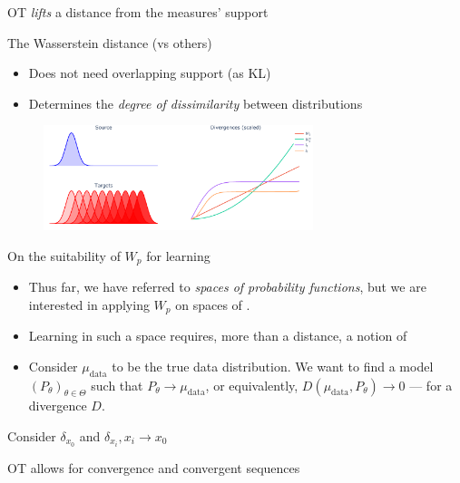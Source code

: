 \documentclass[pdf,aspectratio=169,10pt]{beamer}
\begin{document}
\begin{frame}{OT \emph{lifts} a distance from the measures' support}
\end{frame}

\begin{frame}{The Wasserstein distance (vs others)}
    \begin{itemize}
        \item Does not need overlapping support (as KL)
        \item Determines the \emph{degree of dissimilarity} between distributions
    \end{itemize}
    \begin{figure}
        \centering
            \includegraphics[trim={0 0 0 0},clip, width=0.7\textwidth]{../img/wasserstein_1d.pdf}
        \end{figure}
        \centering
        \small

\end{frame}

\begin{frame}{On the suitability of $W_p$ for learning}

\begin{itemize}
    \item Thus far, we have referred to \emph{spaces of probability functions}, but we are interested in applying $W_p$ on spaces of .
    \item Learning in such a space requires, more than a distance, a notion of 
    \item Consider $\mu_\text{data}$ to be the true data distribution. We want to find a model $(P_\theta)_{\theta\in\Theta}$ such that $P_\theta \to \mu_\text{data}$, or equivalently, $D(\mu_\text{data},P_\theta)\to 0$ --- for a  divergence $D$.
\end{itemize}
\vspace{2em}
\centerline{ Consider $\delta_{x_0}$ and $\delta_{x_i}, x_i\to x_0$}
\vspace{2em}

\centerline{OT allows for  convergence and  convergent sequences}

\end{frame}
\end{document}
